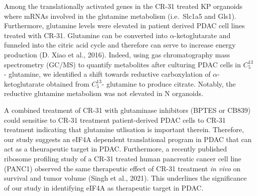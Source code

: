 \documentclass[12pt,openany]{book}
\begin{document}
Among the translationally activated genes in the CR-31 treated KP
organoids where mRNAs involved in the glutamine metabolism (i.e.~Slc1a5
and Gls1). Furthermore, glutamine levels were elevated in patient
derived PDAC cell lines treated with CR-31. Glutamine can be converted
into \(\alpha\)-ketoglutarate and funneled into the citric acid cycle
and therefore can serve to increase energy production (D. Xiao et al.,
2016). Indeed, using gas chromatography mass spectrometry (GC/MS) to
quantify metabolites after culturing PDAC cells in \(C_5^{13}\)-
glutamine, we identified a shift towards reductive carboxylation of
\(\alpha\)-ketoglutarate obtained from \(C_5^{13}\)- glutamine to
produce citrate. Notably, the reductive glutamine metabolism was not
elevated in N organoids.

A combined treatment of CR-31 with glutaminase inhibitors (BPTES or
CB839) could sensitise to CR-31 treatment patient-derived PDAC cells to
CR-31 treatment indicating that glutamine utlisation is important
therein. Therefore, our study suggests an eIF4A dependent translational
program in PDAC that can act as a theurapeutic target in PDAC.
Furthermore, a recently published ribosome profiling study of a CR-31
treated human pancreatic cancer cell line (PANC1) observed the same
therapeutic effect of CR-31 treatment \emph{in vivo} on survival and
tumor volume (Singh et al., 2021). This underlines the significance of
our study in identifying eIF4A as therapeutic target in PDAC.
\end{document}

